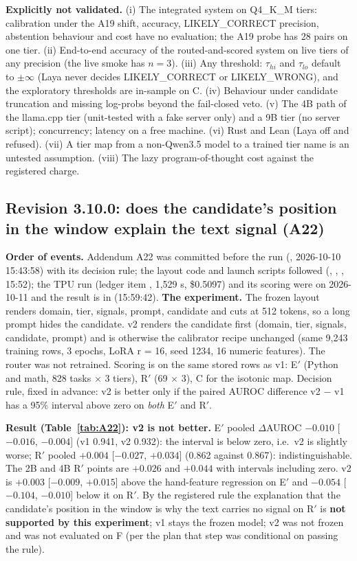 \documentclass[11pt,a4paper]{article}
\newcommand{\code}[1]{\texttt{\detokenize{#1}}}
\begin{document}
\textbf{Explicitly not validated.} (i) The integrated system on Q4\_K\_M tiers: calibration under the A19 shift, accuracy, LIKELY\_CORRECT precision, abstention behaviour and cost have no evaluation; the A19 probe has 28 pairs on one tier. (ii) End-to-end accuracy of the routed-and-scored system on live tiers of any precision (the live smoke has $n=3$). (iii) Any threshold: $\tau_{hi}$ and $\tau_{lo}$ default to $\pm\infty$ (Laya never decides LIKELY\_CORRECT or LIKELY\_WRONG), and the exploratory thresholds are in-sample on C. (iv) Behaviour under candidate truncation and missing log-probs beyond the fail-closed veto. (v) The 4B path of the llama.cpp tier (unit-tested with a fake server only) and a 9B tier (no server script); concurrency; latency on a free machine. (vi) Rust and Lean (Laya off and refused). (vii) A tier map from a non-Qwen3.5 model to a trained tier name is an untested assumption. (viii) The lazy program-of-thought cost against the registered charge.

\subsection{Revision 3.10.0: does the candidate's position in the window explain the text signal (A22)}\label{sec:a22}

\textbf{Order of events.} Addendum A22 was committed before the run (\code{2a76e2f}, 2026-10-10 15:43:58) with its decision rule; the layout code and launch scripts followed (\code{3134a94}, \code{a22f173}, \code{2e41bcb}, 15:52); the TPU run (ledger item \code{tpu_laya-layout-152621}, 1,529 s, \$0.5097) and its scoring were on 2026-10-11 and the result is in \code{b98a627} (15:59:42). \textbf{The experiment.} The frozen layout renders domain, tier, signals, prompt, candidate and cuts at 512 tokens, so a long prompt hides the candidate. v2 renders the candidate first (domain, tier, signals, candidate, prompt) and is otherwise the calibrator recipe unchanged (same 9,243 training rows, 3 epochs, LoRA r = 16, seed 1234, 16 numeric features). The router was not retrained. Scoring is on the same stored rows as v1: E$'$ (Python and math, 828 tasks $\times$ 3 tiers), R$'$ (69 $\times$ 3), C for the isotonic map. Decision rule, fixed in advance: v2 is better only if the paired AUROC difference v2 $-$ v1 has a 95\% interval above zero on \emph{both} E$'$ and R$'$.

\textbf{Result (Table~\ref{tab:A22}): v2 is not better.} E$'$ pooled $\Delta$AUROC $-0.010$ [$-0.016$, $-0.004$] (v1 0.941, v2 0.932): the interval is below zero, i.e.\ v2 is slightly worse; R$'$ pooled $+0.004$ [$-0.027$, $+0.034$] (0.862 against 0.867): indistinguishable. The 2B and 4B R$'$ points are $+0.026$ and $+0.044$ with intervals including zero. v2 is $+0.003$ [$-0.009$, $+0.015$] above the hand-feature regression on E$'$ and $-0.054$ [$-0.104$, $-0.010$] below it on R$'$. By the registered rule the explanation that the candidate's position in the window is why the text carries no signal on R$'$ is \textbf{not supported by this experiment}; v1 stays the frozen model; v2 was not frozen and was not evaluated on F (per the plan that step was conditional on passing the rule).
\end{document}
